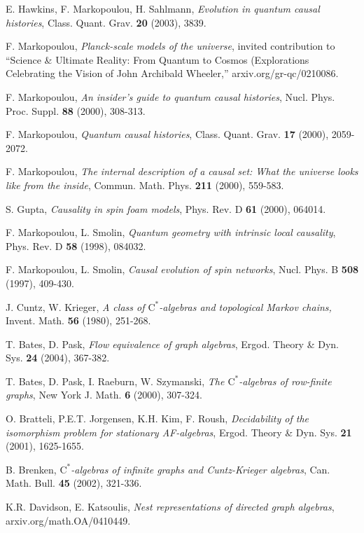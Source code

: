 \documentclass[12pt]{amsart}
\theoremstyle{plain}
\theoremstyle{definition}
\newcommand{\ca}{\mathrm{C}^*}
\begin{document}
\begin{thebibliography}{99}


 E. Hawkins, F. Markopoulou, H. Sahlmann,
\textit{Evolution in quantum causal histories}, Class. Quant.
Grav. {\bf 20} (2003), 3839.

 F. Markopoulou,
\textit{Planck-scale models of the universe}, invited contribution
to ``Science \& Ultimate Reality: From Quantum to Cosmos
(Explorations Celebrating the Vision of John Archibald Wheeler,''
arxiv.org/gr-qc/0210086.

 F. Markopoulou,
\textit{An insider's guide to quantum causal histories}, Nucl.
Phys. Proc. Suppl. {\bf 88} (2000), 308-313.

 F. Markopoulou,
\textit{Quantum causal histories}, Class. Quant. Grav. {\bf 17}
(2000), 2059-2072.

 F. Markopoulou,
\textit{The internal description of a causal set: What the
universe looks like from the inside}, Commun. Math. Phys. {\bf
211} (2000), 559-583.

 S. Gupta,
\textit{Causality in spin foam models}, Phys. Rev. D {\bf 61}
(2000), 064014.

 F. Markopoulou, L. Smolin,
\textit{Quantum geometry with intrinsic local causality}, Phys.
Rev. D {\bf 58} (1998), 084032.

 F. Markopoulou, L. Smolin,
\textit{Causal evolution of spin networks}, Nucl. Phys. B {\bf
508} (1997), 409-430.

 J. Cuntz, W. Krieger,
\textit{A class of $\ca$-algebras and topological Markov chains,}
Invent. Math. \textbf{56} (1980), 251-268.

 T. Bates, D. Pask,
\textit{Flow equivalence of graph algebras}, Ergod. Theory \& Dyn.
Sys. {\bf 24} (2004), 367-382.

 T. Bates, D. Pask, I. Raeburn, W. Szymanski,
\textit{The $\ca$-algebras of row-finite graphs}, New York J.
Math. {\bf 6} (2000), 307-324.

 O. Bratteli, P.E.T. Jorgensen, K.H. Kim, F. Roush,
\textit{Decidability of the isomorphism problem for stationary
AF-algebras}, Ergod. Theory \& Dyn. Sys. {\bf 21} (2001),
1625-1655.

 B. Brenken,
\textit{$\ca$-algebras of infinite graphs and Cuntz-Krieger
algebras}, Can. Math. Bull. {\bf 45} (2002), 321-336.

 K.R. Davidson, E. Katsoulis,
\textit{Nest representations of directed graph algebras},
arxiv.org/math.OA/0410449.


\end{thebibliography}
\end{document}
